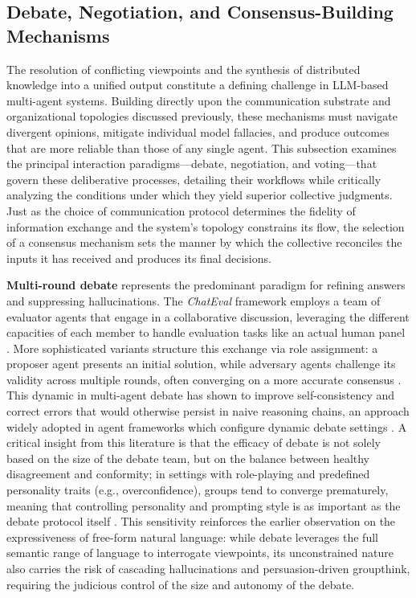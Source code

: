 \documentclass[11pt,a4paper]{article}
\begin{document}
\subsection{Debate, Negotiation, and Consensus-Building Mechanisms}


The resolution of conflicting viewpoints and the synthesis of distributed knowledge into a unified output constitute a defining challenge in LLM-based multi-agent systems. Building directly upon the communication substrate and organizational topologies discussed previously, these mechanisms must navigate divergent opinions, mitigate individual model fallacies, and produce outcomes that are more reliable than those of any single agent. This subsection examines the principal interaction paradigms---debate, negotiation, and voting---that govern these deliberative processes, detailing their workflows while critically analyzing the conditions under which they yield superior collective judgments. Just as the choice of communication protocol determines the fidelity of information exchange and the system's topology constrains its flow, the selection of a consensus mechanism sets the manner by which the collective reconciles the inputs it has received and produces its final decisions.

\textbf{Multi-round debate} represents the predominant paradigm for refining answers and suppressing hallucinations. The \emph{ChatEval} framework employs a team of evaluator agents that engage in a collaborative discussion, leveraging the different capacities of each member to handle evaluation tasks like an actual human panel \cite{arxiv:2308.07201v1}. More sophisticated variants structure this exchange via role assignment: a proposer agent presents an initial solution, while adversary agents challenge its validity across multiple rounds, often converging on a more accurate consensus \cite{arxiv:2310.02124v2}. This dynamic in multi-agent debate has shown to improve self-consistency and correct errors that would otherwise persist in naive reasoning chains, an approach widely adopted in agent frameworks which configure dynamic debate settings \cite{arxiv:2308.10848v3}. A critical insight from this literature is that the efficacy of debate is not solely based on the size of the debate team, but on the balance between healthy disagreement and conformity; in settings with role-playing and predefined personality traits (e.g., overconfidence), groups tend to converge prematurely, meaning that controlling personality and prompting style is as important as the debate protocol itself \cite{arxiv:2310.02124v2}. This sensitivity reinforces the earlier observation on the expressiveness of free-form natural language: while debate leverages the full semantic range of language to interrogate viewpoints, its unconstrained nature also carries the risk of cascading hallucinations and persuasion-driven groupthink, requiring the judicious control of the size and autonomy of the debate.
\end{document}
